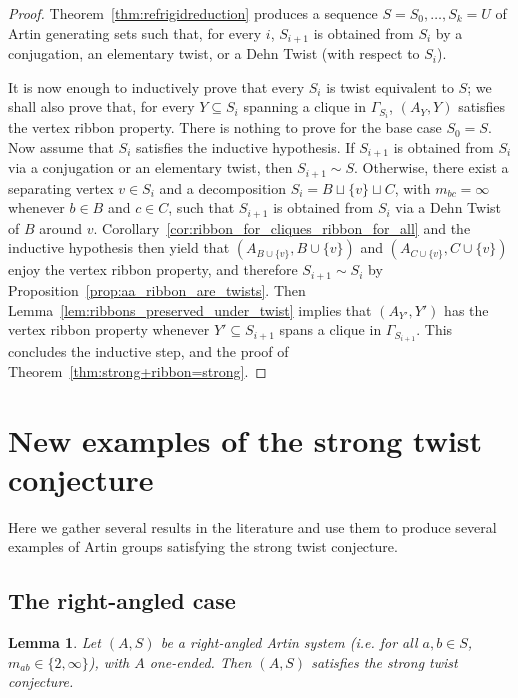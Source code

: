 \documentclass[svgnames]{amsart}
\theoremstyle{plain}
\newtheorem{lemma}[thm]{Lemma}
\theoremstyle{definition}
\begin{document}
\begin{proof}
Theorem~\ref{thm:refrigidreduction} produces a sequence $S=S_0,\ldots,S_k=U$ of Artin generating sets such that, for every $i$, $S_{i+1}$ is obtained from $S_{i}$ by a conjugation, an elementary twist, or a Dehn Twist (with respect to $S_{i}$).

It is now enough to inductively prove that every $S_i$ is twist equivalent to $S$; we shall also prove that, for every $Y\subseteq S_i$ spanning a clique in $\Gamma_{S_i}$, $(A_Y,Y)$ satisfies the vertex ribbon property. There is nothing to prove for the base case $S_0=S$. Now assume that $S_i$ satisfies the inductive hypothesis. If $S_{i+1}$ is obtained from $S_i$ via a conjugation or an elementary twist, then $S_{i+1}\sim S$. Otherwise, there exist a separating vertex $v\in S_i$ and a decomposition $S_i=B\sqcup\{v\}\sqcup C$, with $m_{bc}=\infty$ whenever $b\in B$ and $c\in C$, such that $S_{i+1}$ is obtained from $S_i$ via a Dehn Twist of $B$ around $v$. Corollary~\ref{cor:ribbon_for_cliques_ribbon_for_all} and the inductive hypothesis then yield that $(A_{B\cup \{v\}},{B\cup \{v\}})$ and $(A_{C\cup \{v\}},{C\cup \{v\}})$ enjoy the vertex ribbon property, and therefore $S_{i+1}\sim S_{i}$ by Proposition~\ref{prop:aa_ribbon_are_twists}. Then Lemma~\ref{lem:ribbons_preserved_under_twist} implies that $(A_{Y'},Y')$ has the vertex ribbon property whenever $Y'\subseteq S_{i+1}$ spans a clique in $\Gamma_{S_{i+1}}$. This concludes the inductive step, and the proof of Theorem~\ref{thm:strong+ribbon=strong}.
\end{proof}

\section{New examples of the strong twist conjecture}
Here we gather several results in the literature and use them to produce several examples of Artin groups satisfying the strong twist conjecture.
\subsection{The right-angled case}


\begin{lemma}\label{lem:strong_RAAG}
    Let $(A,S)$ be a right-angled Artin system (i.e. for all $a,b\in S$, $m_{ab}\in \{2, \infty\}$), with $A$ one-ended. Then $(A,S)$ satisfies the strong twist conjecture.
\end{lemma}
\end{document}
